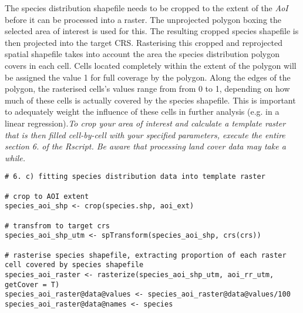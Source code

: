 \documentclass[11pt, a4paper]{article}\usepackage[]{graphicx}\usepackage[]{color}
\begin{document}
The species distribution shapefile needs to be cropped to the extent of the \textit{AoI} before it can be processed into a raster. The unprojected polygon boxing the selected area of interest is used for this. The resulting cropped species shapefile is then projected into the target CRS. Rasterising this cropped and reprojected spatial shapefile takes into account the area the species distribution polygon covers in each cell. Cells located completely within the extent of the polygon will be assigned the value 1 for full coverage by the polygon. Along the edges of the polygon, the rasterised cells's values range from from 0 to 1, depending on how much of these cells is actually covered by the species shapefile. This is important to adequately weight the influence of these cells in further analysis (e.g. in a linear regression).\textit{To crop your area of interest and calculate a template raster that is then filled cell-by-cell with your specified parameters, execute the entire section 6. of the Rscript. Be aware that processing land cover data may take a while.}\newline

\begin{verbatim}
# 6. c) fitting species distribution data into template raster

# crop to AOI extent
species_aoi_shp <- crop(species.shp, aoi_ext)

# transfrom to target crs
species_aoi_shp_utm <- spTransform(species_aoi_shp, crs(crs))

# rasterise species shapefile, extracting proportion of each raster cell covered by species shapefile
species_aoi_raster <- rasterize(species_aoi_shp_utm, aoi_rr_utm, getCover = T)
species_aoi_raster@data@values <- species_aoi_raster@data@values/100
species_aoi_raster@data@names <- species
\end{verbatim}
\end{document}
